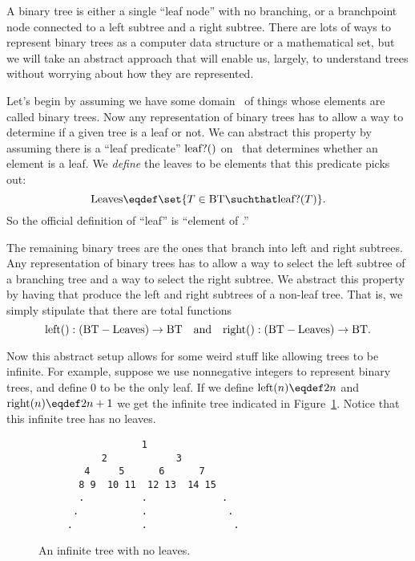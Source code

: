 A binary tree is either a single ``leaf node'' with no branching, or a
branchpoint node connected to a left subtree and a right subtree.
There are lots of ways to represent binary trees as a computer data
structure or a mathematical set, but we will take an abstract approach
that will enable us, largely, to understand trees without worrying
about how they are represented.

Let's begin by assuming we have some domain \bintree\ of things whose
elements are called binary trees.  Now any representation of binary
trees has to allow a way to determine if a given tree is a leaf or
not.  We can abstract this property by assuming there is a ``leaf
predicate'' $\text{leaf?}()$ on \bintree\ that determines whether an element
is a leaf.  We \emph{define} the leaves to be elements that this
predicate picks out:
\[
\leafset \eqdef \set{T \in \bintree \suchthat \leafp{T}}.
\]
So the official definition of ``leaf'' is ``element of \leafset.''

The remaining binary trees are the ones that branch into left and
right subtrees.  Any representation of binary trees has to allow a way
to select the left subtree of a branching tree and a way to select the
right subtree.  We abstract this property by having  that produce the left and right subtrees of a non-leaf
tree.  That is, we simply stipulate that there are total functions
\[
\text{left}(): (\text{BT} - \text{Leaves}) \to \text{BT}\quad \text{and} \quad
\text{right}(): (\text{BT} - \text{Leaves}) \to \text{BT}.
\]

Now this abstract setup allows for some weird stuff like allowing
trees to be infinite.  For example, suppose we use nonnegative
integers to represent binary trees, and define 0 to be the only leaf.
If we define $\leftsub{n} \eqdef 2n$ and $\rightsub{n} \eqdef 2n+1$ we
get the infinite tree indicated in Figure~\ref{inftree123}.  Notice
that this infinite tree has no leaves.

\begin{figure}


\begin{verbatim}
                  1
           2            3
        4     5      6      7
       8 9  10 11  12 13  14 15
       .          .             . 
      .           .              .
     .            .               . 

\end{verbatim}

\caption{An infinite tree with no leaves.}

\label{inftree123}

\end{figure}


